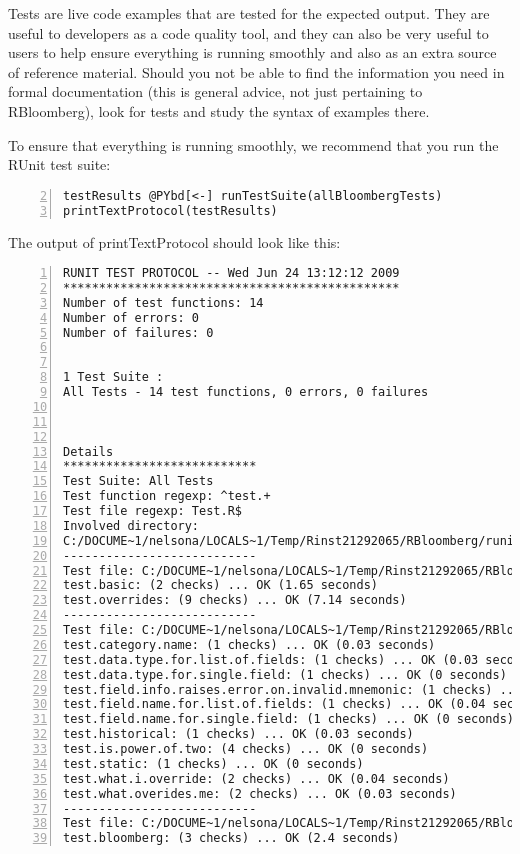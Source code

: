 \documentclass[a4paper]{article}
\begin{document}
Tests are live code examples that are tested for the expected output. They are useful to developers as a code quality tool, and they can also be very useful to users to help ensure everything is running smoothly and also as an extra source of reference material. Should you not be able to find the information you need in formal documentation (this is general advice, not just pertaining to RBloomberg), look for tests and study the syntax of examples there.

To ensure that everything is running smoothly, we recommend that you run the RUnit test suite:

\begin{Verbatim}[commandchars=@\[\],numbers=left,firstnumber=2,stepnumber=1]
testResults @PYbd[<-] runTestSuite(allBloombergTests)
printTextProtocol(testResults)
\end{Verbatim}

    

The output of printTextProtocol should look like this:

\begin{Verbatim}[commandchars=@\[\],numbers=left,firstnumber=1,stepnumber=1]
RUNIT TEST PROTOCOL -- Wed Jun 24 13:12:12 2009 
*********************************************** 
Number of test functions: 14 
Number of errors: 0 
Number of failures: 0 

 
1 Test Suite : 
All Tests - 14 test functions, 0 errors, 0 failures



Details 
*************************** 
Test Suite: All Tests 
Test function regexp: ^test.+ 
Test file regexp: Test.R$ 
Involved directory: 
C:/DOCUME~1/nelsona/LOCALS~1/Temp/Rinst21292065/RBloomberg/runit-tests 
--------------------------- 
Test file: C:/DOCUME~1/nelsona/LOCALS~1/Temp/Rinst21292065/RBloomberg/runit-tests/blpGetDataTest.R 
test.basic: (2 checks) ... OK (1.65 seconds)
test.overrides: (9 checks) ... OK (7.14 seconds)
--------------------------- 
Test file: C:/DOCUME~1/nelsona/LOCALS~1/Temp/Rinst21292065/RBloomberg/runit-tests/blpToolsTest.R 
test.category.name: (1 checks) ... OK (0.03 seconds)
test.data.type.for.list.of.fields: (1 checks) ... OK (0.03 seconds)
test.data.type.for.single.field: (1 checks) ... OK (0 seconds)
test.field.info.raises.error.on.invalid.mnemonic: (1 checks) ... OK (0.02 seconds)
test.field.name.for.list.of.fields: (1 checks) ... OK (0.04 seconds)
test.field.name.for.single.field: (1 checks) ... OK (0 seconds)
test.historical: (1 checks) ... OK (0.03 seconds)
test.is.power.of.two: (4 checks) ... OK (0 seconds)
test.static: (1 checks) ... OK (0 seconds)
test.what.i.override: (2 checks) ... OK (0.04 seconds)
test.what.overides.me: (2 checks) ... OK (0.03 seconds)
--------------------------- 
Test file: C:/DOCUME~1/nelsona/LOCALS~1/Temp/Rinst21292065/RBloomberg/runit-tests/rcomBloombergTest.R 
test.bloomberg: (3 checks) ... OK (2.4 seconds)
\end{Verbatim}
\end{document}
